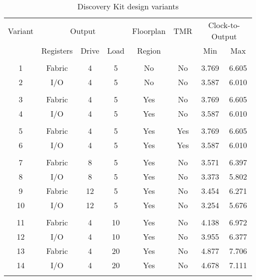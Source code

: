 %
\begin{table}[p]
\caption{Discovery Kit design variants}
\label{tab:pfs_disco_variants}
\begin{center}
\begin{tabular}{|c||c|c|c||c|c||c|c|}
\hline
Variant & \multicolumn{3}{c||}{Output} & Floorplan & TMR &
          \multicolumn{2}{c|}{Clock-to-Output}\\
\cline{2-4}
\cline{7-8}
        & Registers & Drive & Load & Region & & Min & Max\\
\hline\hline
&&&&&&\phantom{XXXXX}&\phantom{XXXXX}\\
 1 &   Fabric &  4 &  5 & No  & No  & 3.769 & 6.605\\
 2 &   I/O    &  4 &  5 & No  & No  & 3.587 & 6.010\\
&&&&&&&\\
 3 &   Fabric &  4 &  5 & Yes & No  & 3.769 & 6.605\\
 4 &   I/O    &  4 &  5 & Yes & No  & 3.587 & 6.010\\
&&&&&&&\\
 5 &   Fabric &  4 &  5 & Yes & Yes & 3.769 & 6.605\\
 6 &   I/O    &  4 &  5 & Yes & Yes & 3.587 & 6.010\\
&&&&&&&\\
 7 &   Fabric &  8 &  5 & Yes & No  & 3.571 & 6.397\\
 8 &   I/O    &  8 &  5 & Yes & No  & 3.373 & 5.802\\
 9 &   Fabric & 12 &  5 & Yes & No  & 3.454 & 6.271\\
10 &   I/O    & 12 &  5 & Yes & No  & 3.254 & 5.676\\
&&&&&&&\\
11 &   Fabric &  4 & 10 & Yes & No  & 4.138 & 6.972\\
12 &   I/O    &  4 & 10 & Yes & No  & 3.955 & 6.377\\
13 &   Fabric &  4 & 20 & Yes & No  & 4.877 & 7.706\\
14 &   I/O    &  4 & 20 & Yes & No  & 4.678 & 7.111\\
&&&&&&&\\
\hline
\end{tabular}
\end{center}
\end{table}
